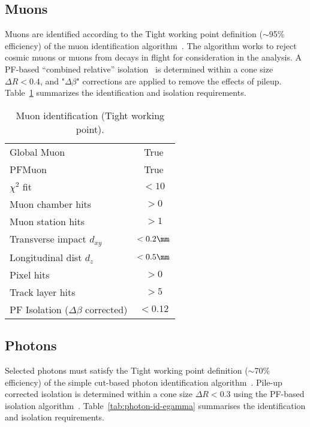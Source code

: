 \subsection{Muons}

Muons are identified according to the Tight working point definition
($\sim$95\% efficiency) of the muon identification
algorithm~\cite{ref:muon-id}. The algorithm works to reject cosmic muons or 
muons from decays in flight for consideration in the analysis. 
A PF-based ``combined relative'' isolation~\cite{ref:muon-id} is determined 
within a cone size $\Delta R < 0.4$, and "$\Delta\beta$" corrections 
are applied to remove the effects of pileup. Table~\ref{tab:muon-id} summarizes the
identification and isolation requirements. 

\begin{table}[h!]
  \caption{Muon identification (Tight working point).\label{tab:muon-id}}
  \centering
  \footnotesize
  \begin{tabular}{ lc }
    \hline
    \hline
    Global Muon                            & True      \\
    PFMuon                                 & True      \\
    $\chi^{2}$ fit                         & $<10$     \\
    Muon chamber hits                      & $>0$      \\
    Muon station hits                      & $>1$      \\
    Transverse impact $d_{xy}$             & $<0.2\mm$ \\
    Longitudinal dist $d_{z}$              & $<0.5\mm$ \\
    Pixel hits                             & $>0$      \\
    Track layer hits                       & $>5$      \\
    PF Isolation ($\Delta\beta$ corrected) & $<0.12$   \\
    \hline
    \hline
  \end{tabular}
\end{table}

\subsection{Photons}
%
Selected photons must satisfy the Tight working point definition 
($\sim$70\% efficiency) of the simple cut-based photon identification
algorithm~\cite{ref:photon-id-egamma}. Pile-up corrected isolation is 
determined within a cone size $\Delta R < 0.3$ using the PF-based 
isolation algorithm~\cite{ref:photon-id-egamma}. 
Table~\ref{tab:photon-id-egamma} summarises the identification
and isolation requirements. 

